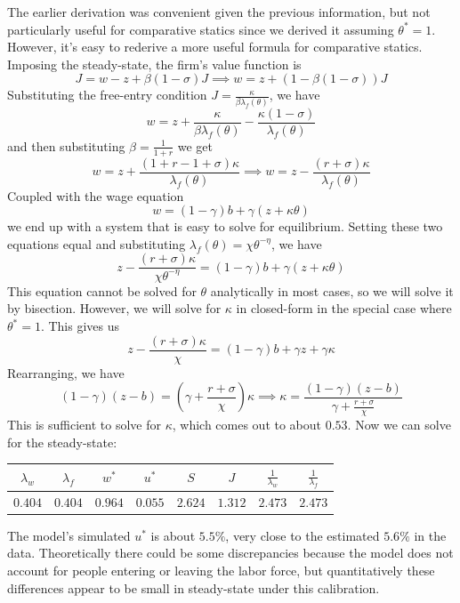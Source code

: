 \documentclass[12pt, letterpaper, parskip = full]{article}
\begin{document}
	The earlier derivation was convenient given the previous information, but not particularly useful for comparative statics since we derived it assuming \(\theta^* = 1\). However, it's easy to rederive a more useful formula for comparative statics. Imposing the steady-state, the firm's value function is
	\[ J = w - z + \beta (1 - \sigma) J \implies w = z + (1 - \beta (1 - \sigma)) J    \]
	Substituting the free-entry condition \(  J = \frac{\kappa}{\beta \lambda_f(\theta)} \), we have
	\[ w = z + \frac{\kappa}{\beta \lambda_f(\theta)} - \frac{\kappa (1 - \sigma)}{\lambda_f(\theta)}   \]
	and then substituting \( \beta = \frac{1}{1+r}\) we get
	\[ w = z + \frac{(1 + r - 1 + \sigma) \kappa}{\lambda_f(\theta)} \implies w = z - \frac{(r + \sigma) \kappa}{\lambda_f(\theta)}   \]
	Coupled with the wage equation
	\[ w = (1 - \gamma) b + \gamma (z + \kappa \theta)    \]
	we end up with a system that is easy to solve for equilibrium. Setting these two equations equal and substituting \(\lambda_f(\theta) = \chi \theta^{-\eta}\), we have
	\[ z - \frac{(r + \sigma) \kappa}{\chi \theta^{-\eta}} = (1 - \gamma) b + \gamma (z + \kappa \theta)       \]
	This equation cannot be solved for \(\theta\) analytically in most cases, so we will solve it by bisection. However, we will solve for \(\kappa\) in closed-form in the special case where \(\theta^* = 1\). This gives us 
	\[ z - \frac{(r + \sigma) \kappa}{\chi} = (1 - \gamma) b + \gamma z + \gamma \kappa       \]
	Rearranging, we have
	\[   (1 - \gamma) (z - b) = \left( \gamma + \frac{r + \sigma}{\chi} \right) \kappa \implies \kappa = \frac{(1 - \gamma)(z - b)}{\gamma + \frac{r + \sigma}{\chi}} \]
	This is sufficient to solve for \(\kappa\), which comes out to about \(0.53\). Now we can solve for the steady-state:

	\begin{center}
	\begin{tabular}{|c|c|c|c|c|c|c|c|}
		\hline
		\(\lambda_w\) & \(\lambda_f\) & \(w^*\) & \(u^*\) & \(S\) & \(J\) & \(\frac{1}{\lambda_w}\) & \(\frac{1}{\lambda_f}\) \\
		\hline
		\(0.404\) & \(0.404\) & \(0.964\) & \(0.055\) & \(2.624\) & \(1.312\) & \(2.473\) & \(2.473\)\\
		\hline
	\end{tabular}
	\end{center}

	The model's simulated \(u^*\) is about \(5.5\%\), very close to the estimated \(5.6\%\) in the data. Theoretically there could be some discrepancies because the model does not account for people entering or leaving the labor force, but quantitatively these differences appear to be small in steady-state under this calibration.
\end{document}
